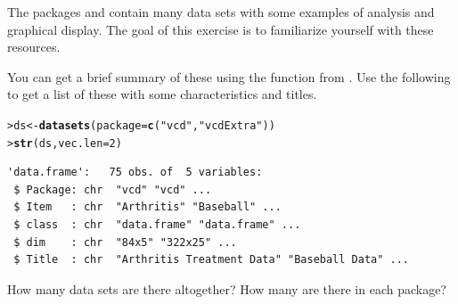 \documentclass[11pt]{report}\usepackage[]{graphicx}\usepackage[]{color}
\makeatletter
\newcommand{\hlnum}[1]{\textcolor[rgb]{0.686,0.059,0.569}{#1}}%
\newcommand{\hlstr}[1]{\textcolor[rgb]{0.192,0.494,0.8}{#1}}%
\newcommand{\hlopt}[1]{\textcolor[rgb]{0,0,0}{#1}}%
\newcommand{\hlstd}[1]{\textcolor[rgb]{0.345,0.345,0.345}{#1}}%
\newcommand{\hlkwb}[1]{\textcolor[rgb]{0.69,0.353,0.396}{#1}}%
\newcommand{\hlkwc}[1]{\textcolor[rgb]{0.333,0.667,0.333}{#1}}%
\newcommand{\hlkwd}[1]{\textcolor[rgb]{0.737,0.353,0.396}{\textbf{#1}}}%
\newenvironment{kframe}{%
 \def\at@end@of@kframe{}%
 \ifinner\ifhmode%
  \def\at@end@of@kframe{\end{minipage}}%
  \begin{minipage}{\columnwidth}%
 \fi\fi%
 \def\FrameCommand##1{\hskip\@totalleftmargin \hskip-\fboxsep
 \colorbox{shadecolor}{##1}\hskip-\fboxsep
     \hskip-\linewidth \hskip-\@totalleftmargin \hskip\columnwidth}%
 \MakeFramed {\advance\hsize-\width
   \@totalleftmargin\z@ \linewidth\hsize
   \@setminipage}}%
 {\par\unskip\endMakeFramed%
 \at@end@of@kframe}
\newenvironment{knitrout}{}{} %
\renewenvironment{knitrout}{\small\renewcommand{\baselinestretch}{.85}}{} %
\makeatother
\begin{document}
\begin{Exercises}

\exercise The packages  and  contain many data sets with some
examples of analysis and graphical display.  The goal of this exercise is to
familiarize yourself with these resources.

You can get a brief summary of
these using the function  from .  Use the following to get a list of
these with some characteristics and titles.
\begin{knitrout}
\color{fgcolor}\begin{kframe}
\begin{alltt}
\hlstd{> }\hlstd{ds} \hlkwb{<-} \hlkwd{datasets}\hlstd{(}\hlkwc{package} \hlstd{=} \hlkwd{c}\hlstd{(}\hlstr{"vcd"}\hlstd{,} \hlstr{"vcdExtra"}\hlstd{))}
\hlstd{> }\hlkwd{str}\hlstd{(ds,} \hlkwc{vec.len} \hlstd{=} \hlnum{2}\hlstd{)}
\end{alltt}
\begin{verbatim}
'data.frame':	75 obs. of  5 variables:
 $ Package: chr  "vcd" "vcd" ...
 $ Item   : chr  "Arthritis" "Baseball" ...
 $ class  : chr  "data.frame" "data.frame" ...
 $ dim    : chr  "84x5" "322x25" ...
 $ Title  : chr  "Arthritis Treatment Data" "Baseball Data" ...
\end{verbatim}
\end{kframe}
\end{knitrout}
  \begin{enumerate*}
    \item How many data sets are there altogether?  How many are there in each package?
\end{enumerate*}
\end{Exercises}
\end{document}
